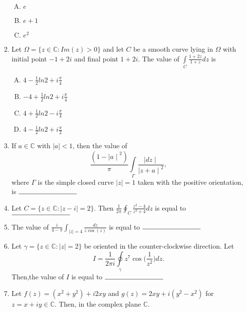 \documentclass[12pt,a4paper]{article}
\begin{document}
\begin{enumerate}
\begin{enumerate}[(A)]
\item $
e
$

\item $
e+1
$

\item $
e^2
$

\end{enumerate}


\item Let $\Omega = \lbrace z \in \mathbb{C} : Im(z) > 0 \rbrace $ and let $C$ be a smooth curve lying in $\Omega $ with initial point $ -1 + 2i$ and final point $1+2i$. The value of $ \int\limits_{C} \frac{1+2z}{1+z} dz $ is

\begin{enumerate}[(A)]

\item $
4-\frac{1}{2} ln 2+ i \frac{\pi}{4}
$

\item $
-4+\frac{1}{2} ln 2+ i \frac{\pi}{4}
$

\item $
4+\frac{1}{2} ln 2- i \frac{\pi}{4}
$

\item $
4-\frac{1}{2} ln 2+ i \frac{\pi}{2}
$

\end{enumerate}

\item If $a \in \mathbb{C} $ with $ \mid a \mid < 1 $, then the value of
$$\frac{(1- {\mid a \mid }^2)}{\pi} \int\limits_{\Gamma} \frac{\mid dz \mid}{{\mid z+a \mid }^2}, $$
where $\Gamma$ is the simple closed curve $ \mid z \mid =1 $  taken with the positive orientation, is 
$\rule{3cm}{0.15mm}$


\item Let $C = \lbrace z \in \mathbb{C} : \mid z-i \mid =2 \rbrace $. Then $ \frac{1}{2 \pi} \oint_{C} \frac{z^2-4}{z^2+4} dz $ is equal to $ \rule{3cm}{0.15mm}$

\item The value of $\frac{i}{4 - \pi} \int_{\mid z \mid =4} \frac{dz}{z \cos(z)}$ is equal to $\rule{3cm}{0.15mm}$

\item Let $ \gamma =\lbrace z \in \mathbb{C} : \mid z \mid =2 \rbrace $ be oriented in the counter-clockwise direction. Let
$$ I = \frac{1}{2 \pi i} \oint\limits_{\gamma} z^7 \cos \Big(\frac{1}{z^2}\Big) dz. $$
Then,the value of $I$ is equal to $\rule{3cm}{0.15mm}$ 

\item Let $f(z)=(x^2+y^2)+i 2 xy $ and $g(z)= 2 xy + i (y^2-x^2) $ for $z= x+ i y \in \mathbb{C} $. Then, in the complex plane $\mathbb{C}$.


\end{enumerate}
\end{document}
